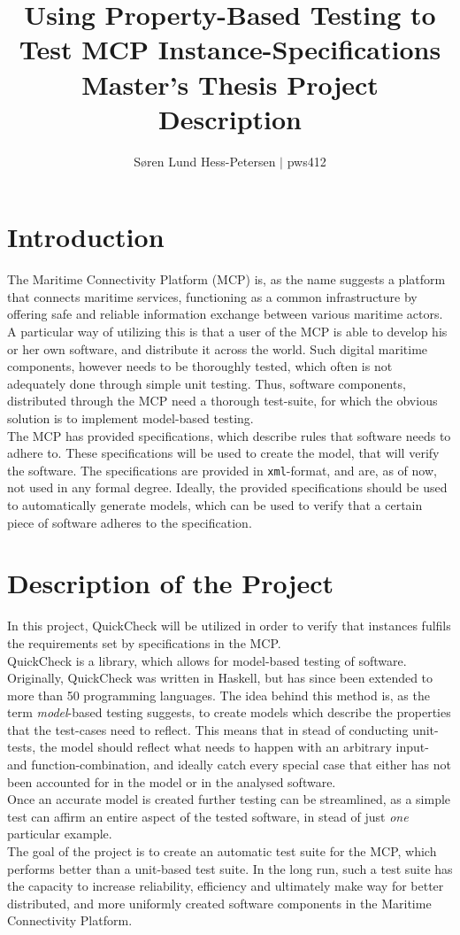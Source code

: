 \documentclass[a4paper]{article}
\title{Using Property-Based Testing to Test MCP Instance-Specifications\\Master's Thesis Project Description}
\author{Søren Lund Hess-Petersen $|$ pws412}
\newcommand{\tit}[1]{\textit{#1}}
\newcommand{\ttt}[1]{\texttt{#1}}
\newcommand{\smallSep}{0.3cm}
\begin{document}
\maketitle
\section*{Introduction}
The Maritime Connectivity Platform \cite{mcp} (MCP) is, as the name suggests a platform that connects maritime services, functioning as a common infrastructure by offering safe and reliable information exchange between various maritime actors. A particular way of utilizing this is that a user of the MCP is able to develop his or her own software, and distribute it across the world. Such digital maritime components, however needs to be thoroughly tested, which often is not adequately done through simple unit testing. Thus, software components, distributed through the MCP need a thorough test-suite, for which the obvious solution is to implement model-based testing.\\[\smallSep]
The MCP has provided specifications, which describe rules that software needs to adhere to. These specifications will be used to create the model, that will verify the software. The specifications are provided in \ttt{xml}-format, and are, as of now, not used in any formal degree. Ideally, the provided specifications should be used to automatically generate models, which can be used to verify that a certain piece of software adheres to the specification. 
\section*{Description of the Project}
In this project, QuickCheck \cite{quickcheck} will be utilized in order to verify that instances fulfils the requirements set by specifications in the MCP.\\[\smallSep]
QuickCheck is a library, which allows for model-based testing of software. Originally, QuickCheck was written in Haskell, but has since been extended to more than 50 programming languages. The idea behind this method is, as the term \tit{model}-based testing suggests, to create models which describe the properties that the test-cases need to reflect. This means that in stead of conducting unit-tests, the model should reflect what needs to happen with an arbitrary input- and function-combination, and ideally catch every special case that either has not been accounted for in the model or in the analysed software.
\\[\smallSep]
Once an accurate model is created further testing can be streamlined, as a simple test can affirm an entire aspect of the tested software, in stead of just \tit{one} particular example.\\[\smallSep]
The goal of the project is to create an automatic test suite for the MCP, which performs better than a unit-based test suite. In the long run, such a test suite has the capacity to increase reliability, efficiency and ultimately make way for better distributed, and more uniformly created software components in the Maritime Connectivity Platform. 
\end{document}
